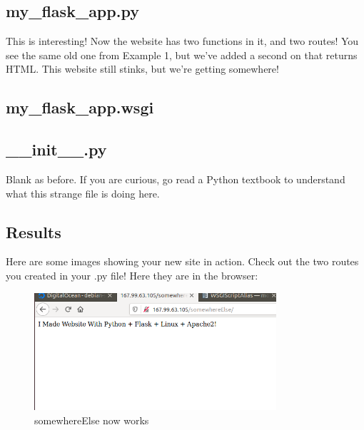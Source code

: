 \documentclass[10pt]{article}
\begin{document}


\subsection{my\_flask\_app.py}
This is interesting! Now the website has two functions in it, and two routes!
You see the same old one from Example 1, but we've added a second on that
returns HTML. This website still stinks, but we're getting somewhere! 



\subsection{my\_flask\_app.wsgi}


\subsection{\_\_init\_\_.py}
Blank as before. If you are curious, go read a Python textbook to understand what this strange file
is doing here.

\subsection{ Results }
Here are some images showing your new site in action. Check out the two routes
you created in your .py file! Here they are in the browser:

\begin{figure}[h]
  \centering
    \includegraphics[width=0.8\textwidth]{somewhereElse.png}
  \caption{somewhereElse now works}
	\label{fig:sameold}
\end{figure}
\end{document}
